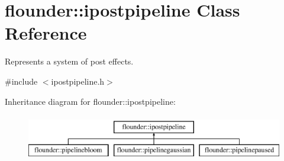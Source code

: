 \hypertarget{classflounder_1_1ipostpipeline}{}\section{flounder\+:\+:ipostpipeline Class Reference}
\label{classflounder_1_1ipostpipeline}


Represents a system of post effects.  




{\ttfamily \#include $<$ipostpipeline.\+h$>$}

Inheritance diagram for flounder\+:\+:ipostpipeline\+:\begin{figure}[H]
\begin{center}
\leavevmode
\includegraphics[height=2.000000cm]{classflounder_1_1ipostpipeline}
\end{center}
\end{figure}

